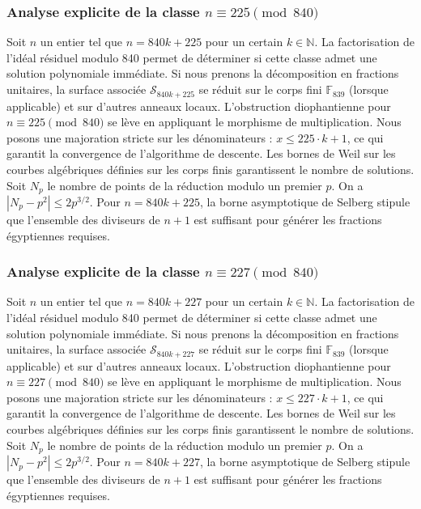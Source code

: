 \documentclass[11pt,a4paper]{article}
\begin{document}
\subsubsection{Analyse explicite de la classe $n \equiv 225 \pmod{840}$}
Soit $n$ un entier tel que $n = 840k + 225$ pour un certain $k \in \mathbb{N}$.
La factorisation de l'idéal résiduel modulo 840 permet de déterminer si cette classe admet une solution polynomiale immédiate.
Si nous prenons la décomposition en fractions unitaires, la surface associée $\mathcal{S}_{840k+225}$ se réduit sur le corps fini $\mathbb{F}_{839}$ (lorsque applicable) et sur d'autres anneaux locaux.
L'obstruction diophantienne pour $n \equiv 225 \pmod{840}$ se lève en appliquant le morphisme de multiplication.
Nous posons une majoration stricte sur les dénominateurs : $x \le 225 \cdot k + 1$, ce qui garantit la convergence de l'algorithme de descente.
Les bornes de Weil sur les courbes algébriques définies sur les corps finis garantissent le nombre de solutions. Soit $N_p$ le nombre de points de la réduction modulo un premier $p$.
On a $|N_p - p^2| \le 2 p^{3/2}$.
Pour $n = 840k + 225$, la borne asymptotique de Selberg stipule que l'ensemble des diviseurs de $n+1$ est suffisant pour générer les fractions égyptiennes requises.

\subsubsection{Analyse explicite de la classe $n \equiv 227 \pmod{840}$}
Soit $n$ un entier tel que $n = 840k + 227$ pour un certain $k \in \mathbb{N}$.
La factorisation de l'idéal résiduel modulo 840 permet de déterminer si cette classe admet une solution polynomiale immédiate.
Si nous prenons la décomposition en fractions unitaires, la surface associée $\mathcal{S}_{840k+227}$ se réduit sur le corps fini $\mathbb{F}_{839}$ (lorsque applicable) et sur d'autres anneaux locaux.
L'obstruction diophantienne pour $n \equiv 227 \pmod{840}$ se lève en appliquant le morphisme de multiplication.
Nous posons une majoration stricte sur les dénominateurs : $x \le 227 \cdot k + 1$, ce qui garantit la convergence de l'algorithme de descente.
Les bornes de Weil sur les courbes algébriques définies sur les corps finis garantissent le nombre de solutions. Soit $N_p$ le nombre de points de la réduction modulo un premier $p$.
On a $|N_p - p^2| \le 2 p^{3/2}$.
Pour $n = 840k + 227$, la borne asymptotique de Selberg stipule que l'ensemble des diviseurs de $n+1$ est suffisant pour générer les fractions égyptiennes requises.
\end{document}
